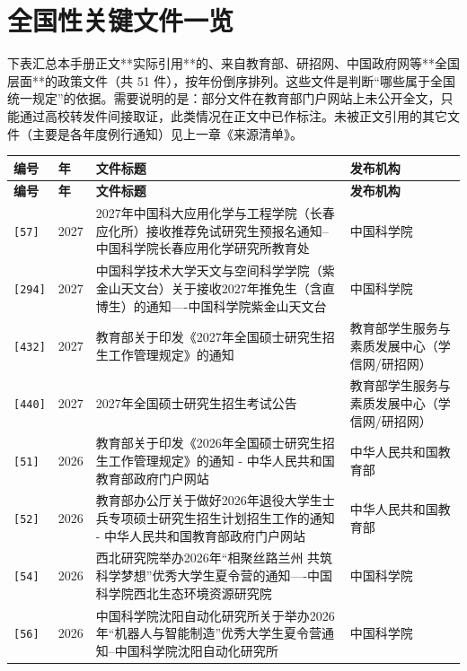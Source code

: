 \chapter{全国性关键文件一览}
\label{app:keydocs}

\begin{keybox}
下表汇总本手册正文**实际引用**的、来自教育部、研招网、中国政府网等**全国层面**的政策文件（共 51 件），按年份倒序排列。这些文件是判断“哪些属于全国统一规定”的依据。需要说明的是：部分文件在教育部门户网站上未公开全文，只能通过高校转发件间接取证，此类情况在正文中已作标注。未被正文引用的其它文件（主要是各年度例行通知）见上一章《来源清单》。
\end{keybox}

{\footnotesize
\begin{longtable}{p{1.6cm}p{1.1cm}p{6.0cm}p{7.3cm}}
\toprule
\textbf{编号} & \textbf{年} & \textbf{文件标题} & \textbf{发布机构} \\ \midrule
\endfirsthead
\toprule \textbf{编号} & \textbf{年} & \textbf{文件标题} & \textbf{发布机构} \\ \midrule
\endhead
{\texttt{[57]}} & 2027 & 2027年中国科大应用化学与工程学院（长春应化所）接收推荐免试研究生预报名通知--中国科学院长春应用化学研究所教育处 & 中国科学院 \\
{\texttt{[294]}} & 2027 & 中国科学技术大学天文与空间科学学院（紫金山天文台）关于接收2027年推免生（含直博生）的通知----中国科学院紫金山天文台 & 中国科学院 \\
{\texttt{[432]}} & 2027 & 教育部关于印发《2027年全国硕士研究生招生工作管理规定》的通知 & 教育部学生服务与素质发展中心（学信网/研招网） \\
{\texttt{[440]}} & 2027 & 2027年全国硕士研究生招生考试公告 & 教育部学生服务与素质发展中心（学信网/研招网） \\
{\texttt{[51]}} & 2026 & 教育部关于印发《2026年全国硕士研究生招生工作管理规定》的通知 - 中华人民共和国教育部政府门户网站 & 中华人民共和国教育部 \\
{\texttt{[52]}} & 2026 & 教育部办公厅关于做好2026年退役大学生士兵专项硕士研究生招生计划招生工作的通知 - 中华人民共和国教育部政府门户网站 & 中华人民共和国教育部 \\
{\texttt{[54]}} & 2026 & 西北研究院举办2026年“相聚丝路兰州 共筑科学梦想”优秀大学生夏令营的通知----中国科学院西北生态环境资源研究院 & 中国科学院 \\
{\texttt{[56]}} & 2026 & 中国科学院沈阳自动化研究所关于举办2026年“机器人与智能制造”优秀大学生夏令营通知--中国科学院沈阳自动化研究所 & 中国科学院 \\

\end{longtable}}
